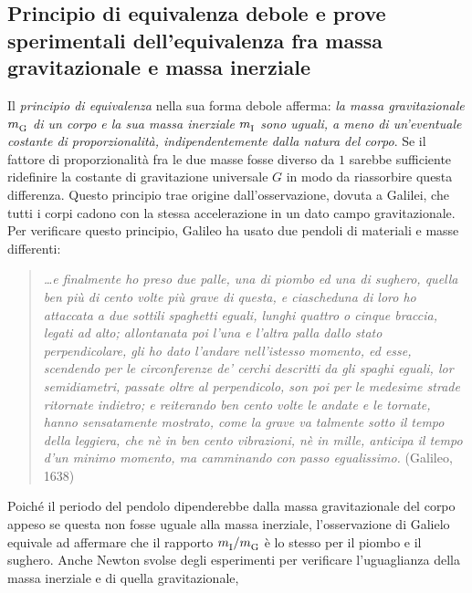 \subsection[Principio di equivalenza debole]{Principio di equivalenza debole e
  prove sperimentali dell'equivalenza fra massa gravitazionale e massa
  inerziale}
\label{sec:princ-equiv-debole}

Il \emph{principio di equivalenza} nella
sua forma debole afferma:
\emph{la massa gravitazionale $m_{\textup{G}}^{}$ di
  un corpo e la sua massa inerziale $m_{\textup{I}}^{}$
  sono uguali, a meno di un'eventuale costante di proporzionalità,
  indipendentemente dalla natura del corpo}.
Se il fattore di proporzionalità fra le due masse fosse diverso da $1$ sarebbe
sufficiente ridefinire la costante di
gravitazione universale $G$ in modo da riassorbire questa differenza.  Questo
principio trae origine dall'osservazione, dovuta a Galilei, che tutti i corpi
cadono con la stessa accelerazione in un dato campo gravitazionale.  Per
verificare questo principio, Galileo ha usato due pendoli di materiali e masse
differenti:
\begin{quotation}
  {\itshape \dots e finalmente ho preso due palle, una di piombo ed una di
    sughero, quella ben più di cento volte più grave di questa, e ciascheduna di
    loro ho attaccata a due sottili spaghetti eguali, lunghi quattro o cinque
    braccia, legati ad alto; allontanata poi l'una e l'altra palla dallo stato
    perpendicolare, gli ho dato l'andare nell'istesso momento, ed esse,
    scendendo per le circonferenze de' cerchi descritti da gli spaghi eguali,
    lor semidiametri, passate oltre al perpendicolo, son poi per le medesime
    strade ritornate indietro; e reiterando ben cento volte le andate e le
    tornate, hanno sensatamente mostrato, come la grave va talmente sotto il
    tempo della leggiera, che nè in ben cento vibrazioni, nè in mille, anticipa
    il tempo d'un minimo momento, ma camminando con passo egualissimo.}
  (Galileo, 1638)
\end{quotation}
Poiché il periodo del pendolo dipenderebbe dalla massa gravitazionale del corpo
appeso se questa non fosse uguale alla massa inerziale, l'osservazione di
Galielo equivale ad affermare che il rapporto
$m_{\textup{I}}^{}/m_{\textup{G}}^{}$
è lo stesso per il piombo e il sughero.  Anche Newton svolse degli esperimenti
per verificare l'uguaglianza della massa inerziale e di quella gravitazionale,
